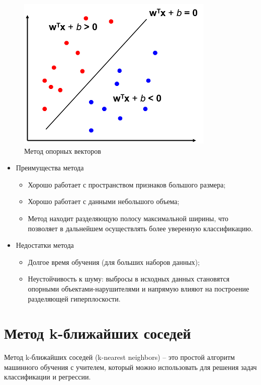 \captionsetup{justification=centering,singlelinecheck=off}
\begin{figure}[h!]
	\centering
		\includegraphics[pages=-, scale=0.9]{img/svm.png}
		\caption{Метод опорных векторов}  
\end{figure}

\begin{itemize}
\item Преимущества метода
	\begin{itemize}
	\item Хорошо работает с пространством признаков большого размера;
	\item Хорошо работает с данными небольшого объема;
	\item Метод находит разделяющую полосу максимальной ширины, что позволяет в дальнейшем осуществлять более уверенную классификацию.
	\end{itemize}

\item Недостатки метода
	\begin{itemize}
	\item Долгое время обучения (для больших наборов данных);
	\item Неустойчивость к шуму: выбросы в исходных данных становятся опорными объектами-нарушителями и напрямую влияют на построение разделяющей гиперплоскости.
	\end{itemize}
\end{itemize}

\section {Метод k-ближайших соседей}

Метод k-ближайших соседей (k-nearest neighbors) – это простой алгоритм машинного обучения с учителем, который можно использовать для решения задач классификации и регрессии.

